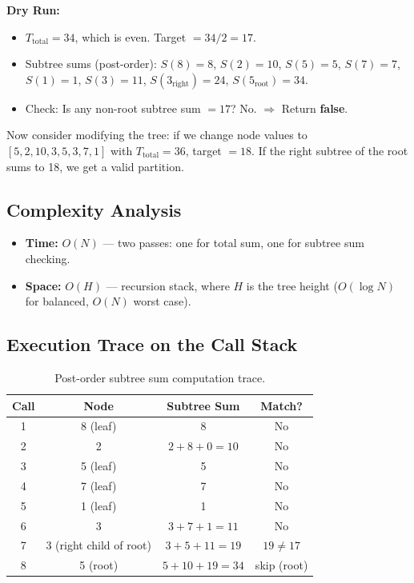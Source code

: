 \documentclass[10pt,journal,compsoc,onecolumn]{IEEEtran}
\begin{document}
\textbf{Dry Run:}
\begin{itemize}
    \item $T_{\text{total}} = 34$, which is even. Target $= 34/2 = 17$.
    \item Subtree sums (post-order): $S(8)=8$, $S(2)=10$, $S(5)=5$, $S(7)=7$, $S(1)=1$, $S(3)=11$, $S(3_{\text{right}})=24$, $S(5_{\text{root}})=34$.
    \item Check: Is any non-root subtree sum $= 17$? No. $\Rightarrow$ Return \textbf{false}.
\end{itemize}

Now consider modifying the tree: if we change node values to $[5, 2, 10, 3, 5, 3, 7, 1]$ with $T_{\text{total}} = 36$, target $= 18$. If the right subtree of the root sums to 18, we get a valid partition.

\subsection{Complexity Analysis}

\begin{itemize}
    \item \textbf{Time:} $O(N)$ --- two passes: one for total sum, one for subtree sum checking.
    \item \textbf{Space:} $O(H)$ --- recursion stack, where $H$ is the tree height ($O(\log N)$ for balanced, $O(N)$ worst case).
\end{itemize}

\subsection{Execution Trace on the Call Stack}

\begin{table}[htbp]
\centering
\begin{tabular}{|c|c|c|c|}
\hline
\textbf{Call} & \textbf{Node} & \textbf{Subtree Sum} & \textbf{Match?} \\
\hline
1 & 8 (leaf) & 8 & No \\
2 & 2 & $2+8+0=10$ & No \\
3 & 5 (leaf) & 5 & No \\
4 & 7 (leaf) & 7 & No \\
5 & 1 (leaf) & 1 & No \\
6 & 3 & $3+7+1=11$ & No \\
7 & 3 (right child of root) & $3+5+11=19$ & $19 \neq 17$ \\
8 & 5 (root) & $5+10+19=34$ & skip (root) \\
\hline
\end{tabular}
\caption{Post-order subtree sum computation trace.}
\end{table}
\end{document}
